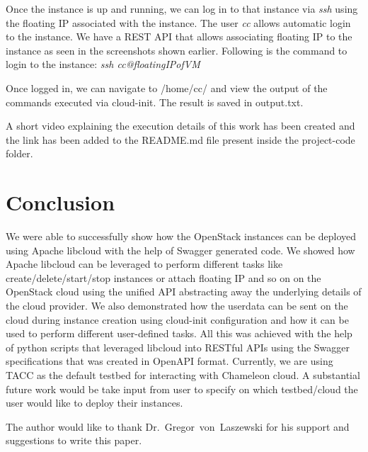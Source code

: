 Once the instance is up and running, we can log in to that instance via
\textit{ssh} using the floating IP associated with the instance. The user
\textit{cc} allows automatic login to the instance. We have a REST API that
allows associating floating IP to the instance as seen in the screenshots shown
earlier. Following is the command to login to the instance:
\textit{ssh cc@floatingIPofVM}

Once logged in, we can navigate to /home/cc/ and view the output of the 
commands executed via cloud-init. The result is saved in output.txt.

A short video explaining the execution details of this work has been
created and the link has been added to the README.md file present inside the  
project-code folder.

\section{Conclusion}
We were able to successfully show how the OpenStack instances can be deployed 
using Apache libcloud with the help of Swagger generated code. We showed how 
Apache libcloud can be leveraged to perform different tasks like 
create/delete/start/stop instances or attach floating IP and so on on the 
OpenStack cloud using the unified API abstracting away the underlying details 
of the cloud provider. We also demonstrated how the userdata can be sent on 
the cloud during instance creation using cloud-init configuration and how it 
can be used to perform different user-defined tasks. All this was achieved 
with the help of python scripts that leveraged libcloud into RESTful APIs 
using the Swagger specifications that was created in OpenAPI format. 
Currently, we are using TACC as the default testbed for interacting with 
Chameleon cloud. A substantial future work would be take input from user to 
specify on which testbed/cloud the user would like to deploy their instances. 

\begin{acks}

  The author would like to thank Dr.~Gregor~von~Laszewski for his
  support and suggestions to write this paper.

\end{acks}


 


